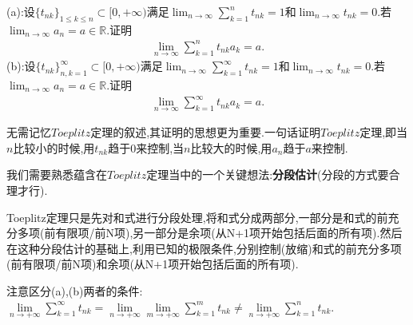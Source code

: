 \documentclass[../../main.tex]{subfiles}
\begin{document}
\begin{theorem}[Toeplitz定理]\label{theorem:Toeplitz定理}
(a):设\(\{t_{nk}\}_{1\leqslant k\leqslant n} \subset [0, +\infty)\)满足\(\lim_{n \to \infty} \sum\limits_{k = 1}^{n} t_{nk} = 1\)和\(\lim_{n \to \infty} t_{nk} = 0\).若\(\lim_{n \to \infty} a_n = a \in \mathbb{R}\).证明
\begin{align}\label{equation:2.5}
\lim_{n \to \infty} \sum\limits_{k = 1}^{n} t_{nk}a_k = a.
\end{align}
(b):设\(\{t_{nk}\}_{n,k = 1}^{\infty} \subset [0, +\infty)\)满足\(\lim_{n \to \infty} \sum\limits_{k = 1}^{\infty} t_{nk} = 1\)和\(\lim_{n \to \infty} t_{nk} = 0\).若\(\lim_{n \to \infty} a_n = a \in \mathbb{R}\).证明
\begin{align}\label{equation:2.6}
\lim_{n \to \infty} \sum\limits_{k = 1}^{\infty} t_{nk}a_k = a.
\end{align}
\end{theorem}
\begin{note}
无需记忆$Toeplitz$定理的叙述,其证明的思想更为重要.一句话证明$Toeplitz$定理,即当\(n\)比较小的时候,用\(t_{nk}\)趋于\(0\)来控制,当\(n\)比较大的时候,用\(a_n\)趋于\(a\)来控制.

我们需要熟悉蕴含在$Toeplitz$定理当中的一个关键想法:\textbf{分段估计}(分段的方式要合理才行).

Toeplitz定理只是先对和式进行分段处理,将和式分成两部分,一部分是和式的前充分多项(前有限项/前N项),另一部分是余项(从N+1项开始包括后面的所有项).然后在这种分段估计的基础上,利用已知的极限条件,分别控制(放缩)和式的前充分多项(前有限项/前N项)和余项(从N+1项开始包括后面的所有项).
\end{note}
\begin{remark}
注意区分(a),(b)两者的条件:$\underset{n\rightarrow +\infty}{\lim}\sum\limits_{k=1}^{\infty}{t_{nk}}=\underset{n\rightarrow +\infty}{\lim}\underset{m\rightarrow +\infty}{\lim}\sum\limits_{k=1}^m{t_{nk}}\ne \underset{n\rightarrow +\infty}{\lim}\sum\limits_{k=1}^n{t_{nk}}$.
\end{remark}
\end{document}
